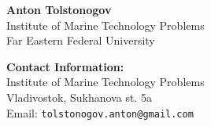 \documentclass[a0,portrait]{a0poster}
\begin{document}
\begin{minipage}[t]{0.48\linewidth}
\huge \textbf{Anton Tolstonogov}\\ %
\huge Institute of Marine Technology Problems\\ %
\huge Far Eastern Federal University\\
\end{minipage}
\hfill
\begin{minipage}[t]{0.48\linewidth}
\vspace{-1.0cm}
\begin{flushleft}
\color{DarkSlateGray}\Large \textbf{Contact Information:}\\
Institute of Marine Technology Problems\\ %
Vladivostok, Sukhanova st. 5a\\
Email: \texttt{tolstonogov.anton@gmail.com}\\ %
\end{flushleft}
\end{minipage}
\end{document}
